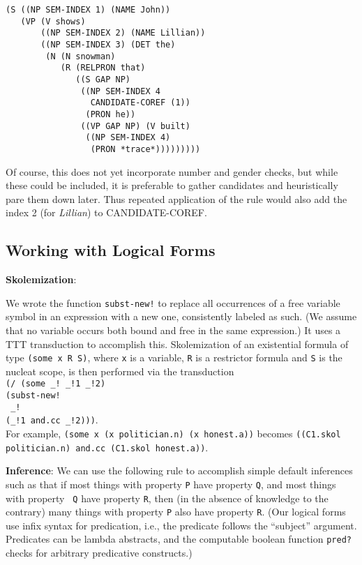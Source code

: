 \documentclass[a4,11pt]{article}
\begin{document}
\scriptsize
\begin{verbatim}
(S ((NP SEM-INDEX 1) (NAME John))
   (VP (V shows) 
       ((NP SEM-INDEX 2) (NAME Lillian))
       ((NP SEM-INDEX 3) (DET the)
        (N (N snowman)
           (R (RELPRON that)
              ((S GAP NP)
               ((NP SEM-INDEX 4 
                 CANDIDATE-COREF (1))
                (PRON he))
               ((VP GAP NP) (V built)
                ((NP SEM-INDEX 4) 
                 (PRON *trace*)))))))))
\end{verbatim}
\normalsize 

Of course, this does not yet incorporate number and gender checks, but
while these could be included, it is preferable to gather candidates
and heuristically pare them down later. Thus repeated application of the
rule would also add the index 2 (for {\it Lillian}) to CANDIDATE-COREF.

\subsection*{Working with Logical Forms}
{\bf Skolemization}:

We wrote the function \texttt{subst-new!} to replace all occurrences of a free variable symbol in an expression with a new one, consistently labeled as such. (We assume that no variable occurs both bound and free in the same expression.)  It uses a TTT transduction to accomplish this. 
Skolemization of an existential formula of type \texttt{(some x R S)}, where \texttt{x} is a variable, \texttt{R} is a restrictor formula and \texttt{S} is the nucleat scope, is then performed via the transduction\\
\small
\hspace*{2em}\texttt{(/ (some \_! \_!1 \_!2)}\\
\hspace*{4em}\texttt{(subst-new!}\\
\hspace*{9em}\texttt{ \_!}\\
\hspace*{9.5em}\texttt{(\_!1 and.cc \_!2)))}.\\
\normalsize
For example, \small \texttt{(some x (x politician.n) (x honest.a))} \normalsize becomes
\small \texttt{((C1.skol politician.n) and.cc (C1.skol honest.a))}\normalsize.

{\bf Inference}:
We can use the following rule to accomplish simple default inferences such as that if most things with property \texttt{P} have property \texttt{Q}, and most things with property \texttt{ Q} have property \texttt{R}, then (in the absence of knowledge to the contrary) many things with property \texttt{P} also have property \texttt{R}. (Our logical forms use infix syntax for predication, i.e., the predicate follows the ``subject'' argument. Predicates can be lambda abstracts, and the computable boolean function \texttt{pred?} checks for arbitrary predicative constructs.)
\end{document}
